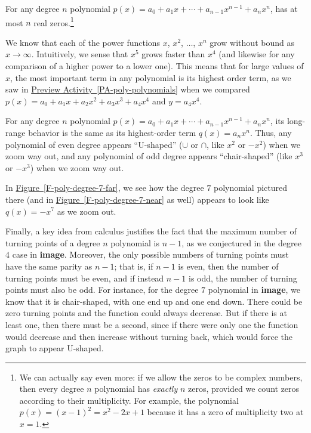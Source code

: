 \documentclass{ximera}
\begin{document}
For any degree $n$ polynomial $p(x) = a_0 + a_1 x + \cdots + a_{n-1}x^{n-1} + a_n x^n$, has at most $n$ real zeros.\footnote{We can actually say even more:  if we allow the zeros to be complex numbers, then every degree $n$ polynomial has \emph{exactly} $n$ zeros, provided we count zeros according to their multiplicity.  For example, the polynomial $p(x) = (x-1)^2 = x^2 - 2x + 1$ because it has a zero of multiplicity two at $x = 1$.\label{fn-36}}%

We know that each of the power functions $x$, $x^2$, $\ldots$, $x^n$ grow without bound as $x \to \infty$.  Intuitively, we sense that $x^5$ grows faster than $x^4$ (and likewise for any comparison of a higher power to a lower one).  This means that for large values of $x$, the most important term in any polynomial is its highest order term, as we saw in \hyperref[PA-poly-polynomials]{Preview Activity~\ref{PA-poly-polynomials}} when we compared $p(x) = a_0 + a_1 x + a_2 x^2 + a_3 x^3 + a_4 x^4$ and $y = a_4 x^4$.%

For any degree $n$ polynomial $p(x) = a_0 + a_1 x + \cdots + a_{n-1}x^{n-1} + a_n x^n$, its long-range behavior is the same as its highest-order term $q(x) = a_n x^n$.  Thus, any polynomial of even degree appears ``U-shaped'' ($\cup$ or $\cap$, like $x^2$ or $-x^2$) when we zoom way out, and any polynomial of odd degree appears ``chair-shaped'' (like $x^3$ or $-x^3$) when we zoom way out.%

In \hyperref[F-poly-degree-7-far]{Figure~\ref{F-poly-degree-7-far}}, we see how the degree $7$ polynomial pictured there (and in \hyperref[F-poly-degree-7-near]{Figure~\ref{F-poly-degree-7-near}} as well) appears to look like $q(x) = -x^7$ as we zoom out.%




Finally, a key idea from calculus justifies the fact that the maximum number of turning points of a degree $n$ polynomial is $n-1$, as we conjectured in the degree $4$ case in \textbf{image}.  Moreover, the only possible numbers of turning points must have the same parity as $n-1$; that is, if $n-1$ is even, then the number of turning points must be even, and if instead $n-1$ is odd, the number of turning points must also be odd.  For instance, for the degree $7$ polynomial in \textbf{image}, we know that it is chair-shaped, with one end up and one end down.  There could be zero turning points and the function could always decrease.  But if there is at least one, then there must be a second, since if there were only one the function would decrease and then increase without turning back, which would force the graph to appear U-shaped.%
\end{document}
